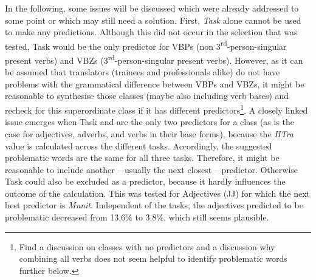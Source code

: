 \textup{In the following, some issues will be discussed which were already addressed to some point or which may still need a solution. First,} \textit{Task} \textup{alone cannot be used to make any predictions. Although this did not occur in the  selection that was tested,} Task \textup{would be the only predictor for VBPs (non 3}\textup{\textsuperscript{rd}}\textup{{}-}\textup{person-singular present verbs) and VBZs (3}\textup{\textsuperscript{rd}}\textup{{}-}\textup{person-singular present verbs). However, as it can be assumed that translators (trainees and professionals alike) do not have problems with the grammatical difference between VBPs and VBZs, it might be reasonable to synthesise those  classes (maybe also including verb bases) and recheck for this superordinate class if it has different predictors}\footnote{Find a discussion on  classes with no predictors and a discussion why combining all verbs does not seem helpful to identify problematic words further below.}\textup{. A closely linked issue emerges when Task and}  \textup{are the only two predictors for a  class (as is the case for} \textup{adjectives, adverbs, and verbs in their base forms), because the} \textit{HTra} \textup{value is calculated across the different tasks. Accordingly, the suggested problematic words are the same for all three tasks. Therefore, it might be reasonable to include another – usually the next closest – predictor. Otherwise Task could also be excluded as a predictor, because it hardly influences the outcome of the calculation. This was tested for Adjectives (JJ) for which the next best predictor is} \textit{Munit}\textup{. Independent of the tasks, the adjectives predicted to be problematic decreased from 13.6\% to 3.8\%, which still seems plausible.}



